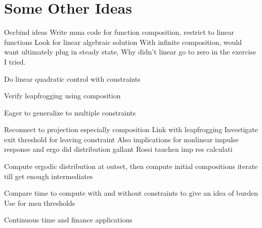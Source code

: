\documentclass[12pt]{article}
\begin{document}





\section{Some Other Ideas}
\label{sec:some-other-ideas}

Occbind ideas
Write mma code for function composition, restrict to linear functions Look for linear algebraic solution With infinite composition, would want ultimately plug in steady state, Why didn't linear go to zero in the exercise I tried.

Do linear quadratic control with constraints

Verify leapfrogging using composition


Eager to generalize to multiple constraints

Reconnect to projection especially composition Link with leapfrogging Investigate exit threshold for leaving constraint Also implications for nonlinear impulse response and ergo did distribution gallant Rossi tauchen imp res calculati

Compute ergodic distribution at outset, then compute initial compositions iterate till get enough intermediates

Compare time to compute with and without constraints to give an idea of burden Use for msu thresholds

Continuous time and finance applications
\end{document}
